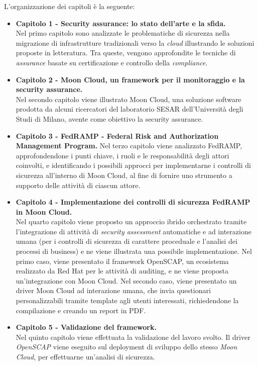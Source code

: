 \documentclass[../main.tex]{subfiles}
\begin{document}
L'organizzazione dei capitoli è la seguente:
\begin{itemize}
    \item \textbf{Capitolo 1 - Security assurance: lo stato dell'arte e la sfida.}
        \\Nel primo capitolo sono analizzate le problematiche di sicurezza nella migrazione di infrastrutture tradizionali verso la \textit{cloud} illustrando le soluzioni proposte in letteratura.
        Tra queste, vengono approfondite le tecniche di \textit{assurance} basate su certificazione e controllo della \textit{compliance}.
    \item \textbf{Capitolo 2 - Moon Cloud, un framework per il monitoraggio e la security assurance.}
        \\Nel secondo capitolo viene illustrato Moon Cloud, una soluzione software prodotta da alcuni ricercatori del laboratorio SESAR dell'Università degli Studi di Milano, avente come obiettivo la security assurance.
    \item \textbf{Capitolo 3 - FedRAMP - Federal Risk and Authorization Management Program.}
        Nel terzo capitolo viene analizzato FedRAMP, approfondendone i punti chiave, i ruoli e le responsabilità degli attori coinvolti, e identificando
        i possibili approcci per implementarne i controlli di sicurezza all'interno di Moon Cloud, al fine di fornire uno strumento a supporto delle attività di ciascun attore.
    \item \textbf{Capitolo 4 - Implementazione dei controlli di sicurezza FedRAMP in Moon Cloud.}\\
        Nel quarto capitolo viene proposto un approccio ibrido orchestrato tramite l'integrazione di attività di \textit{security assessment} automatiche e ad interazione umana (per i controlli di sicurezza di carattere proceduale e l'analisi dei processi di business)
        e ne viene illustrata una possibile implementazione.
        Nel primo caso, viene presentato il framework OpenSCAP, un ecosistema realizzato da Red Hat per le attività di auditing, e ne viene proposta un'integrazione con Moon Cloud.
        Nel secondo caso, viene presentato un driver Moon Cloud ad interazione umana, che invia questionari personalizzabili tramite template agli utenti interessati, richiedendone la compilazione e creando un report in PDF.
    \item \textbf{Capitolo 5 - Validazione del framework.}\\
        Nel quinto capitolo viene effettuata la validazione del lavoro svolto. Il driver \textit{OpenSCAP} viene eseguito sul deployment di sviluppo dello stesso \textit{Moon Cloud}, per effettuarne un'analisi di sicurezza.

\end{itemize}
\end{document}
